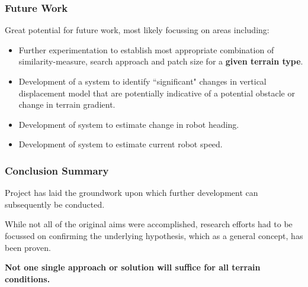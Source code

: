 \documentclass[10pt, compress]{beamer}
\begin{document}
\begin{frame}[fragile]
  \frametitle{Future Work}

	Great potential for future work, most likely focussing on areas including:
	
	\begin{itemize}[label={\textbullet}]
  	\item Further experimentation to establish most appropriate combination of similarity-measure, search approach and patch size for a \textbf{given terrain type}. 
  	\item Development of a system to identify ``significant" changes in vertical displacement model that are potentially indicative of a potential obstacle or change in terrain gradient.
  	\item Development of system to estimate change in robot heading.
  	\item Development of system to estimate current robot speed.
  \end{itemize}
	
\end{frame}

\begin{frame}[fragile]
  \frametitle{Conclusion Summary}
  
	Project has laid the groundwork upon which further development can subsequently be conducted. \\ \vspace{0.2cm}
	
	While not all of the original aims were accomplished, research efforts had to be focussed on confirming the underlying hypothesis, which as a general concept, has been proven. \\ \vspace{0.2cm}
	
	\textbf{Not one single approach or solution will suffice for all terrain conditions.}

\end{frame}
\end{document}
